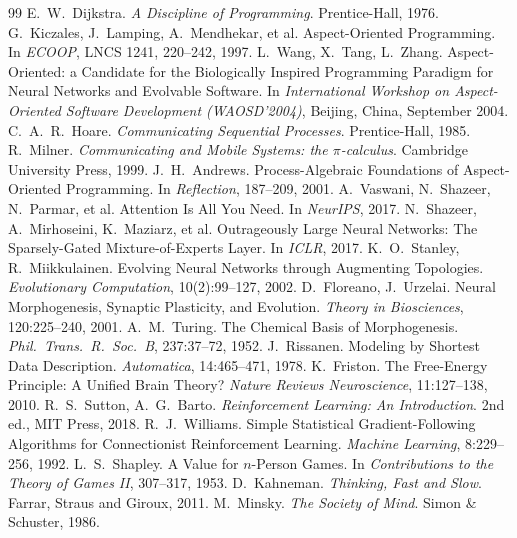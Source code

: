 \documentclass[11pt]{article}
\theoremstyle{definition}
\begin{document}
\begin{thebibliography}{99}
 E.~W.~Dijkstra. \emph{A Discipline of Programming}. Prentice-Hall, 1976.
 G.~Kiczales, J.~Lamping, A.~Mendhekar, et al. Aspect-Oriented Programming. In \emph{ECOOP}, LNCS 1241, 220--242, 1997.
 L.~Wang, X.~Tang, L.~Zhang. Aspect-Oriented: a Candidate for the Biologically Inspired Programming Paradigm for Neural Networks and Evolvable Software. In \emph{International Workshop on Aspect-Oriented Software Development (WAOSD'2004)}, Beijing, China, September 2004.
 C.~A.~R.~Hoare. \emph{Communicating Sequential Processes}. Prentice-Hall, 1985.
 R.~Milner. \emph{Communicating and Mobile Systems: the $\pi$-calculus}. Cambridge University Press, 1999.
 J.~H.~Andrews. Process-Algebraic Foundations of Aspect-Oriented Programming. In \emph{Reflection}, 187--209, 2001.
 A.~Vaswani, N.~Shazeer, N.~Parmar, et al. Attention Is All You Need. In \emph{NeurIPS}, 2017.
 N.~Shazeer, A.~Mirhoseini, K.~Maziarz, et al. Outrageously Large Neural Networks: The Sparsely-Gated Mixture-of-Experts Layer. In \emph{ICLR}, 2017.
 K.~O.~Stanley, R.~Miikkulainen. Evolving Neural Networks through Augmenting Topologies. \emph{Evolutionary Computation}, 10(2):99--127, 2002.
 D.~Floreano, J.~Urzelai. Neural Morphogenesis, Synaptic Plasticity, and Evolution. \emph{Theory in Biosciences}, 120:225--240, 2001.
 A.~M.~Turing. The Chemical Basis of Morphogenesis. \emph{Phil.\ Trans.\ R.\ Soc.\ B}, 237:37--72, 1952.
 J.~Rissanen. Modeling by Shortest Data Description. \emph{Automatica}, 14:465--471, 1978.
 K.~Friston. The Free-Energy Principle: A Unified Brain Theory? \emph{Nature Reviews Neuroscience}, 11:127--138, 2010.
 R.~S.~Sutton, A.~G.~Barto. \emph{Reinforcement Learning: An Introduction}. 2nd ed., MIT Press, 2018.
 R.~J.~Williams. Simple Statistical Gradient-Following Algorithms for Connectionist Reinforcement Learning. \emph{Machine Learning}, 8:229--256, 1992.
 L.~S.~Shapley. A Value for $n$-Person Games. In \emph{Contributions to the Theory of Games II}, 307--317, 1953.
 D.~Kahneman. \emph{Thinking, Fast and Slow}. Farrar, Straus and Giroux, 2011.
 M.~Minsky. \emph{The Society of Mind}. Simon \& Schuster, 1986.
\end{thebibliography}
\end{document}
